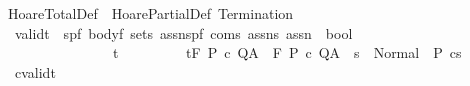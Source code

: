%
\begin{isabellebody}%
%
%
\isamarkuptrue%
%
\isadelimtheory
%
\endisadelimtheory
%
\isatagtheory
{}\isamarkupfalse%
\ HoareTotalDef\ \ HoarePartialDef\ Termination\ %
\endisatagtheory
{\isafoldtheory}%
%
\isadelimtheory
%
\endisadelimtheory
%
\isamarkuptrue%
\isamarkupfalse%
\isanewline
\ \ validt\ {\isacharcolon}{\isacharcolon}\ {\isachardoublequoteopen}{\isacharbrackleft}{\isacharparenleft}{\isacharprime}s{\isacharcomma}{\isacharprime}p{\isacharcomma}{\isacharprime}f{\isacharparenright}\ body{\isacharcomma}{\isacharprime}f\ set{\isacharcomma}{\isacharprime}s\ assn{\isacharcomma}{\isacharparenleft}{\isacharprime}s{\isacharcomma}{\isacharprime}p{\isacharcomma}{\isacharprime}f{\isacharparenright}\ com{\isacharcomma}{\isacharprime}s\ assn{\isacharcomma}{\isacharprime}s\ assn{\isacharbrackright}\ {\isasymRightarrow}\ bool{\isachardoublequoteclose}\isanewline
\ \ \ \ \ \ \ \ \ \ \ \ \ \ \ \ {\isacharparenleft}{\isachardoublequoteopen}{\isacharunderscore}{\isasymTurnstile}\isactrlsub t\isactrlbsub {\isacharprime}{\isacharslash}{\isacharunderscore}\isactrlesub {\isacharslash}\ {\isacharunderscore}\ {\isacharunderscore}\ {\isacharunderscore}{\isacharcomma}{\isacharunderscore}{\isachardoublequoteclose}\ \ {\isacharbrackleft}{}{}{\isacharcomma}{}{}{\isacharcomma}{}{}{}{}{\isacharcomma}\ {}{}{\isacharcomma}\ {}{}{}{}{\isacharcomma}{}{}{}{}{\isacharbrackright}\ {}{}{\isacharparenright}\isanewline
{}\isanewline
\ {\isachardoublequoteopen}{\isasymGamma}{\isasymTurnstile}\isactrlsub t\isactrlbsub {\isacharslash}F\isactrlesub \ P\ c\ Q{\isacharcomma}A\ {\isasymequiv}\ {\isasymGamma}{\isasymTurnstile}\isactrlbsub {\isacharslash}F\isactrlesub \ P\ c\ Q{\isacharcomma}A\ {\isasymand}\ {\isacharparenleft}{\isasymforall}s\ {\isasymin}\ Normal\ {\isacharbackquote}\ P{\isachardot}\ {\isasymGamma}{\isasymturnstile}c{\isasymdown}s{\isacharparenright}{\isachardoublequoteclose}\isanewline
\isanewline
{}\isamarkupfalse%
\isanewline
\ \ cvalidt{\isacharcolon}{\isacharcolon}\isanewline

\end{isabellebody}
